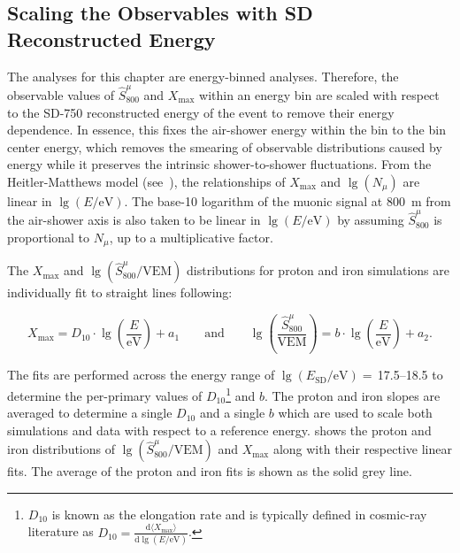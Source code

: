 \subsection{Scaling the Observables with SD Reconstructed Energy}\label{ssec:flattening}


The analyses for this chapter are energy-binned analyses.
Therefore, the observable values of $\hat{S}^{\mu}_{800}$ and $X_{\text{max}}$ within an energy bin are scaled with respect to the SD-750 reconstructed energy of the event to remove their energy dependence.
In essence, this fixes the air-shower energy within the bin to the bin center energy, which removes the smearing of observable distributions caused by energy while it preserves the intrinsic shower-to-shower fluctuations.
From the Heitler-Matthews model (see~), the relationships of $X_{\text{max}}$ and $\lg\left(N_{\mu}\right)$ are linear in $\lg\left(E / \text{eV}\right)$.
The base-10 logarithm of the muonic signal at \qty{800}{\meter} from the air-shower axis is also taken to be linear in $\lg\left(E / \text{eV}\right)$ by assuming $\hat{S}^{\mu}_{800}$ is proportional to $N_{\mu}$, up to a multiplicative factor.

The $X_{\text{max}}$ and $\lg\left(\hat{S}^{\mu}_{800} / \text{VEM}\right)$ distributions for proton and iron simulations are individually fit to straight lines following:

\begin{equation}
  X_{\text{max}} = D_{10} \cdot \lg\left(\frac{E}{\text{eV}}\right) + a_{1} \qquad \text{and} \qquad \lg\left(\frac{\hat{S}^{\mu}_{800}}{\text{VEM}}\right) = b \cdot \lg\left(\frac{E}{\text{eV}}\right) + a_{2}. \label{eq:linear_fits}
\end{equation}

\noindent
The fits are performed across the energy range of $\lg\left(E_{\text{SD}} / \text{eV}\right)=$\,\numrange{17.5}{18.5} to determine the per-primary values of $D_{10}$\footnote[2]{$D_{10}$ is known as the elongation rate and is typically defined in cosmic-ray literature as $D_{10} = \frac{\text{d}\langle X_{\text{max}}\rangle}{\text{d}\lg\left(E / \text{eV}\right)}$.} and $b$.
The proton and iron slopes are averaged to determine a single $D_{10}$ and a single $b$ which are used to scale both simulations and data with respect to a reference energy.
 shows the proton and iron distributions of  $\lg\left(\hat{S}^{\mu}_{800} / \text{VEM}\right)$ and $X_{\text{max}}$ along with their respective linear fits.
The average of the proton and iron fits is shown as the solid grey line.

